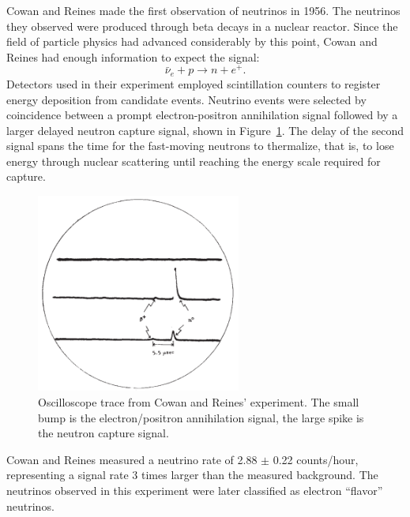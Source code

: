 Cowan and Reines made the first observation of neutrinos in 1956.  The neutrinos they observed were produced through beta decays in a nuclear reactor.  Since the field of particle physics had advanced considerably by this point, Cowan and Reines had enough information to expect the signal: 
\begin{equation} \label{beta} \bar{\nu}_e + p \rightarrow n + e^+.  \end{equation}
Detectors used in their experiment employed scintillation counters to register energy deposition from candidate events.  Neutrino events were selected by coincidence between a prompt electron-positron annihilation signal followed by a larger delayed neutron capture signal, shown in Figure~\ref{oscilloscope}.  The delay of the second signal spans the time for the fast-moving neutrons to thermalize, that is, to lose energy through nuclear scattering until reaching the energy scale required for capture. 
\begin{figure}[b!]
  \begin{center}
    \includegraphics[width=0.6\textwidth]{figures/figures/cowanOscilloscope.png}
  \end{center}
  \caption{Oscilloscope trace from Cowan and Reines' experiment.  The small bump is the electron/positron annihilation signal, the large spike is the neutron capture signal.}
  \label{oscilloscope}
\end{figure}
Cowan and Reines measured a neutrino rate of 2.88 $\pm$ 0.22 counts/hour, representing a signal rate 3 times larger than the measured background.  \cite{cowan}  The neutrinos observed in this experiment were later classified as electron ``flavor''  neutrinos.

